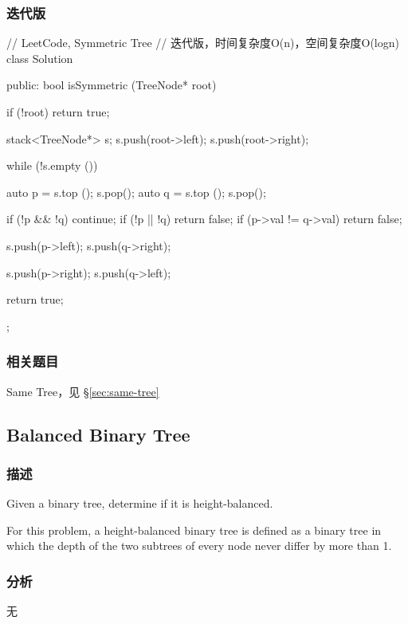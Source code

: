 \subsubsection{迭代版}
\begin{Code}
// LeetCode, Symmetric Tree
// 迭代版，时间复杂度O(n)，空间复杂度O(logn)
class Solution {
public:
    bool isSymmetric (TreeNode* root) {
        if (!root) return true;

        stack<TreeNode*> s;
        s.push(root->left);
        s.push(root->right);

        while (!s.empty ()) {
            auto p = s.top (); s.pop();
            auto q = s.top (); s.pop();

            if (!p && !q) continue;
            if (!p || !q) return false;
            if (p->val != q->val) return false;

            s.push(p->left);
            s.push(q->right);

            s.push(p->right);
            s.push(q->left);
        }

        return true;
    }
};
\end{Code}


\subsubsection{相关题目}
\begindot
\item Same Tree，见 \S \ref{sec:same-tree}
\myenddot


\subsection{Balanced Binary Tree}
\label{sec:balanced-binary-tree}


\subsubsection{描述}
Given a binary tree, determine if it is height-balanced.

For this problem, a height-balanced binary tree is defined as a binary tree in which the depth of the two subtrees of every node never differ by more than 1.


\subsubsection{分析}
无


